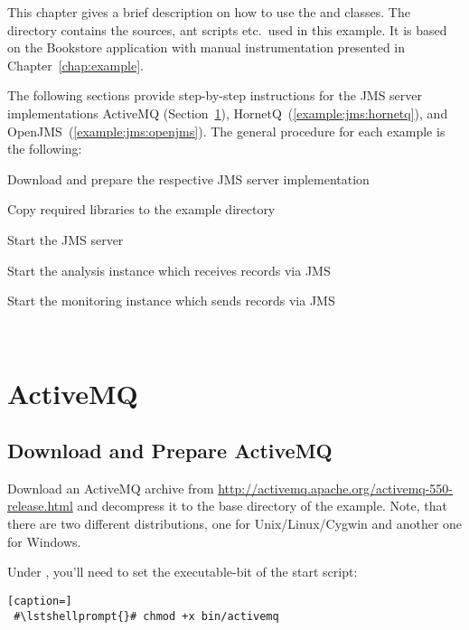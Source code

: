 This chapter gives a brief description on how to use the  and  %
classes. The directory \dir{\JMSBookstoreApplicationDirDistro/} contains the %
sources, ant scripts etc.\ used in this example. It is based on the Bookstore %
application with manual instrumentation presented in Chapter~\ref{chap:example}. %

The following sections provide step-by-step instructions for the %
JMS server implementations ActiveMQ (Section~\ref{example:jms:activemq}), %
HornetQ~(\ref{example:jms:hornetq}), and OpenJMS~(\ref{example:jms:openjms}).
The general procedure for each example is the following:

\medskip

\begin{compactenum}
 \item Download and prepare the respective JMS server implementation
 \item Copy required libraries to the example directory
 \item Start the JMS server
 \item Start the analysis instance which receives records via JMS
 \item Start the monitoring instance which sends records via JMS
\end{compactenum}

\


\section{ActiveMQ}\label{example:jms:activemq}

\subsection{Download and Prepare ActiveMQ}

Download an ActiveMQ archive from \url{http://activemq.apache.org/activemq-550-release.html} %
and decompress it to the base directory of the example. Note, that there are two different %
distributions, one for Unix/Linux/Cygwin and another one for Windows. 

Under \UnixLikeSystems{}, you'll need to set the executable-bit of the start script:

\setBashListing
\begin{lstlisting}[caption=]
 #\lstshellprompt{}# chmod +x bin/activemq
\end{lstlisting}

